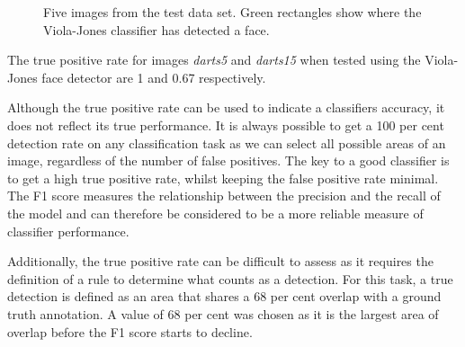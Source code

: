 \documentclass[conference]{IEEEtran}
\begin{document}
\begin{figure}[htb]
\caption{Five images from the test data set. Green rectangles show where the Viola-Jones classifier has detected a face. }
\label{fig:q13}
\end{figure}
\par 
The true positive rate for images \emph{darts5} and \emph{darts15} when tested using the Viola-Jones face detector are 1 and 0.67 respectively. 
\par
Although the true positive rate can be used to indicate a classifiers accuracy, it does not reflect its true performance. It is always possible to get a 100 per cent detection rate on any classification task as we can select all possible areas of an image, regardless of the number of false positives. The key to a good classifier is to get a high true positive rate, whilst keeping the false positive rate minimal. The F1 score measures the relationship between the precision and the recall of the model and can therefore be considered to be a more reliable measure of classifier performance.
\par
Additionally, the true positive rate can be difficult to assess as it requires the definition of a rule to determine what counts as a detection. For this task, a true detection is defined as an area that shares a 68 per cent overlap with a ground truth annotation. A value of 68 per cent was chosen as it is the largest area of overlap before the F1 score starts to decline. 
\par 
\end{document}
